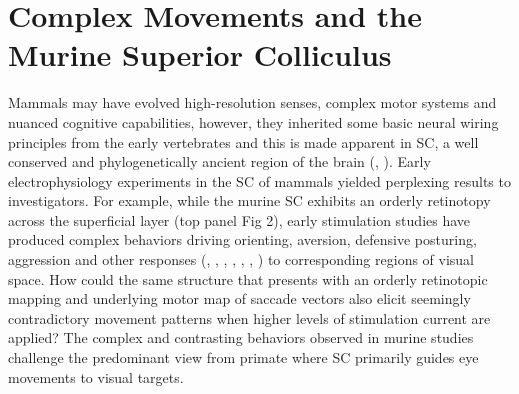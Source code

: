 \documentclass{ar-1col}
\begin{document}
\section{Complex Movements and the Murine Superior Colliculus} 
Mammals may have evolved high-resolution senses, complex motor systems and nuanced cognitive capabilities, however, they inherited some basic neural wiring principles from the early vertebrates and this is made apparent in SC, a well conserved and phylogenetically ancient region of the brain (\cite{butler2008evolution}, \cite{schneider2014brain}). Early electrophysiology experiments in the SC of mammals yielded perplexing results to investigators. For example, while the murine SC exhibits an orderly retinotopy across the superficial layer (top panel Fig 2), early stimulation studies have produced complex behaviors driving orienting, aversion, defensive posturing, aggression and other responses (\cite{mchaffie1982eye}, \cite{weldon1983rotational}, \cite{imperato1981behavioural}, \cite{olds1963approach}, \cite{valenstein1965independence}, \cite{panksepp1971aggression}, \cite{waldbillig1975attack}) to corresponding regions of visual space. How could the same structure that presents with an orderly retinotopic mapping and underlying motor map of saccade vectors also elicit seemingly contradictory movement patterns when higher levels of stimulation current are applied? The complex and contrasting behaviors observed in murine studies challenge the predominant view from primate where SC primarily guides eye movements to visual targets.
\end{document}
